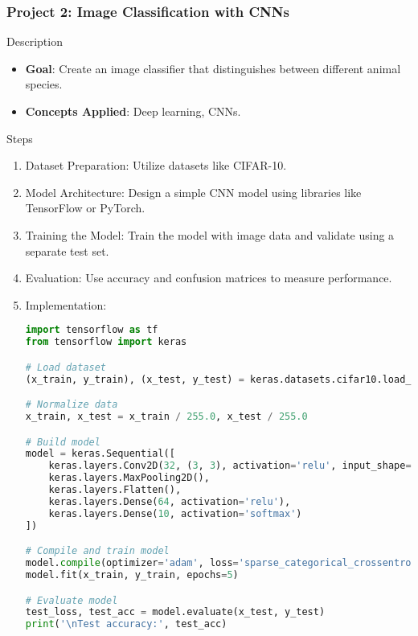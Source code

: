 \documentclass[aspectratio=169]{beamer}
\begin{document}
\begin{frame}[fragile]
    \frametitle{Project 2: Image Classification with CNNs}
    \begin{block}{Description}
        \begin{itemize}
            \item \textbf{Goal}: Create an image classifier that distinguishes between different animal species.
            \item \textbf{Concepts Applied}: Deep learning, CNNs.
        \end{itemize}
    \end{block}
    
    \begin{block}{Steps}
        \begin{enumerate}
            \item Dataset Preparation: Utilize datasets like CIFAR-10.
            \item Model Architecture: Design a simple CNN model using libraries like TensorFlow or PyTorch.
            \item Training the Model: Train the model with image data and validate using a separate test set.
            \item Evaluation: Use accuracy and confusion matrices to measure performance.
            \item Implementation:
            \begin{lstlisting}[language=Python]
import tensorflow as tf
from tensorflow import keras

# Load dataset
(x_train, y_train), (x_test, y_test) = keras.datasets.cifar10.load_data()

# Normalize data
x_train, x_test = x_train / 255.0, x_test / 255.0

# Build model
model = keras.Sequential([
    keras.layers.Conv2D(32, (3, 3), activation='relu', input_shape=(32, 32, 3)),
    keras.layers.MaxPooling2D(),
    keras.layers.Flatten(),
    keras.layers.Dense(64, activation='relu'),
    keras.layers.Dense(10, activation='softmax')
])

# Compile and train model
model.compile(optimizer='adam', loss='sparse_categorical_crossentropy', metrics=['accuracy'])
model.fit(x_train, y_train, epochs=5)

# Evaluate model
test_loss, test_acc = model.evaluate(x_test, y_test)
print('\nTest accuracy:', test_acc)
            \end{lstlisting}
        \end{enumerate}
    \end{block}
\end{frame}
\end{document}
